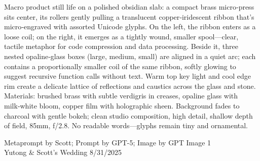 \documentclass[12pt]{article}
\begin{document}
\noindent
\begin{adjustbox}{max size={\textwidth}{\textheight}}
\begin{varwidth}{\textwidth}
\RaggedRight
\footnotesize
Macro product still life on a polished obsidian slab: a compact brass micro‑press sits center, its rollers gently pulling a translucent copper‑iridescent ribbon that’s micro‑engraved with assorted Unicode glyphs. On the left, the ribbon enters as a loose coil; on the right, it emerges as a tightly wound, smaller spool—clear, tactile metaphor for code compression and data processing. Beside it, three nested opaline‑glass boxes (large, medium, small) are aligned in a quiet arc; each contains a proportionally smaller coil of the same ribbon, softly glowing to suggest recursive function calls without text. Warm top key light and cool edge rim create a delicate lattice of reflections and caustics across the glass and stone. Materials: brushed brass with subtle verdigris in creases, opaline glass with milk‑white bloom, copper film with holographic sheen. Background fades to charcoal with gentle bokeh; clean studio composition, high detail, shallow depth of field, 85mm, f/2.8. No readable words—glyphs remain tiny and ornamental.
\end{varwidth}
\end{adjustbox}
\vfill
{\raggedleft\footnotesize
Metaprompt by Scott; Prompt by GPT-5; Image by GPT Image 1 \\
Yutong \& Scott's Wedding 8/31/2025\par}
\end{document}
